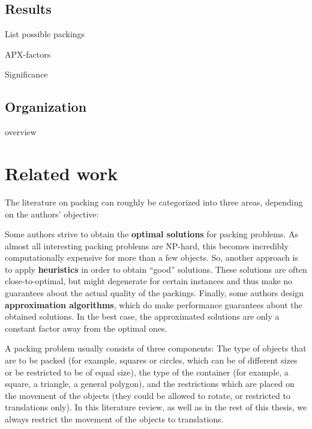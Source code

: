 \documentclass[a4paper,style=print,bibliography=totoc,nexus,lnum,extramargin]{tubsbook}
\begin{document}
\section{Results}

List possible packings

APX-factors

Significance

%
%
%

\section{Organization}

overview

\chapter{Related work}

The literature on packing can roughly be categorized into three areas, depending on the authors' objective:

Some authors strive to obtain the \textbf{optimal solutions} for packing problems. As almost all interesting packing problems are NP-hard, this becomes incredibly computationally expensive for more than a few objects.
So, another approach is to apply \textbf{heuristics} in order to obtain “good” solutions. These solutions are often close-to-optimal, but might degenerate for certain instances and thus make no guarantees about the actual quality of the packings.
Finally, some authors design \textbf{approximation algorithms}, which do make performance guarantees about the obtained solutions. In the best case, the approximated solutions are only a constant factor away from the optimal ones.

A packing problem usually consists of three components: The type of objects that are to be packed (for example, squares or circles, which can be of different sizes or be restricted to be of equal size), the type of the container (for example, a square, a triangle, a general polygon), and the restrictions which are placed on the movement of the objects (they could be allowed to rotate, or restricted to translations only). In this literature review, as well as in the rest of this thesis, we always restrict the movement of the objects to translations.
\end{document}
